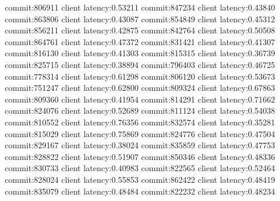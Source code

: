 commit:806911 client latency:0.53211
commit:847234 client latency:0.43840
commit:863806 client latency:0.43087
commit:854849 client latency:0.45312
commit:856211 client latency:0.42875
commit:842764 client latency:0.50508
commit:864761 client latency:0.47372
commit:831421 client latency:0.41307
commit:816130 client latency:0.41303
commit:815315 client latency:0.36739
commit:825715 client latency:0.38894
commit:796403 client latency:0.46725
commit:778314 client latency:0.61298
commit:806120 client latency:0.53673
commit:751247 client latency:0.62800
commit:809324 client latency:0.67863
commit:809360 client latency:0.41954
commit:814291 client latency:0.71662
commit:824076 client latency:0.52689
commit:811124 client latency:0.54038
commit:810552 client latency:0.76356
commit:832574 client latency:0.35281
commit:815029 client latency:0.75869
commit:824776 client latency:0.47504
commit:829167 client latency:0.38024
commit:835859 client latency:0.47753
commit:828822 client latency:0.51907
commit:850346 client latency:0.48336
commit:830733 client latency:0.40983
commit:822565 client latency:0.52464
commit:828024 client latency:0.55853
commit:862422 client latency:0.48419
commit:835079 client latency:0.48484
commit:822232 client latency:0.48234